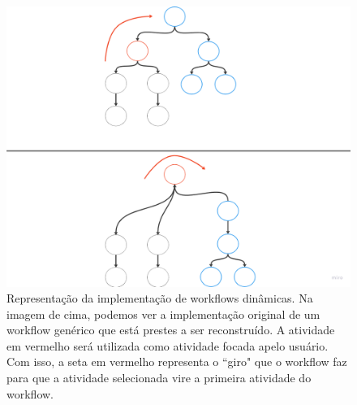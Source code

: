 \begin{figure}
    \centering
    \includegraphics[width=1\textwidth]{imgs/Implementacoes/primeiraImplementacao.png}
    \caption{Representação da implementação de workflows dinâmicas. Na imagem de cima, podemos ver a implementação original de um workflow genérico que está prestes a ser reconstruído. A atividade em vermelho será utilizada como atividade focada apelo usuário. Com isso, a seta em vermelho representa o ``giro" que o workflow faz para que a atividade selecionada vire a primeira atividade do workflow.}
    \label{fig:primeira_implementacao}
\end{figure}

